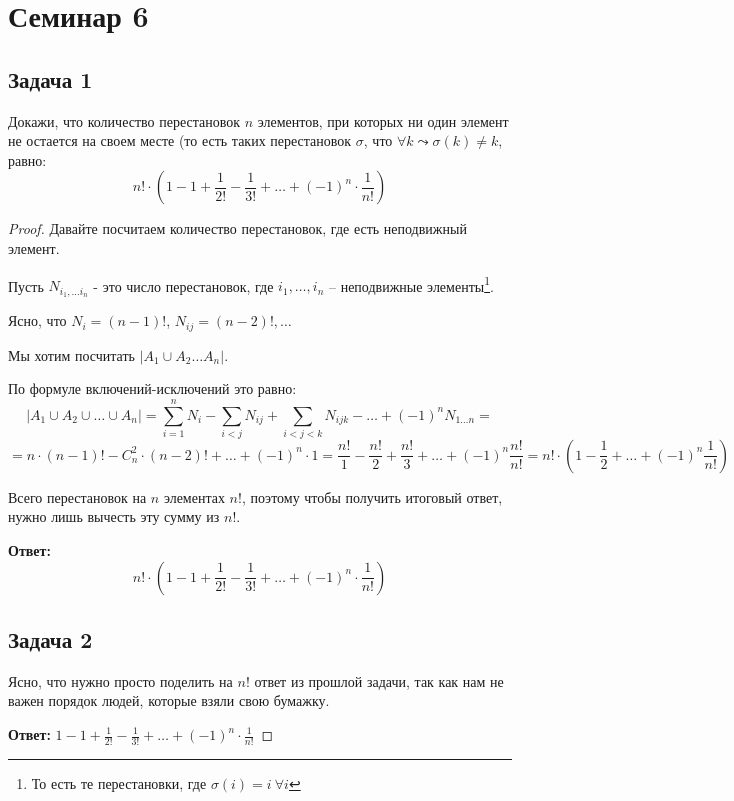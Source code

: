 
\section{Семинар 6}

\subsection{Задача 1}

Докажи, что количество перестановок $n$ элементов, при которых ни один элемент не
остается на своем месте (то есть таких перестановок $\sigma$, что $\forall k \leadsto \sigma(k) \neq  k$, равно:
\[
n! \cdot (1 - 1 + \frac{1}{2!} - \frac{1}{3!} + \ldots + (-1)^n \cdot \frac{1}{n!})
\]

\begin{proof}
Давайте посчитаем количество перестановок, где есть неподвижный элемент.

Пусть $N_{i_1, \ldots i_n}$ - это число перестановок, где $i_1, \ldots, i_n$ -- неподвижные элементы\footnote{То есть те перестановки, где $\sigma(i) = i \ \forall i $}.

Ясно, что $N_i = (n-1)!$, $N_{ij} = (n-2)!, \ldots$

Мы хотим посчитать $|A_1 \cup A_2 \ldots A_n|$.

По формуле включений-исключений это равно:
\[
|A_1 \cup A_2 \cup \ldots \cup A_n| = \sum_{i=1}^nN_i - \sum_{i<j}{N_{ij}} + \sum_{i<j<k}{N_{ijk}} - \ldots + (-1)^n N_{1\ldots n} =
\]
\[
= n \cdot (n-1)! - C^2_n \cdot (n-2)! + \ldots + (-1)^n \cdot 1 = \frac{n!}{1} - \frac{n!}{2} + \frac{n!}{3} + \ldots + (-1)^n \frac{n!}{n!} = n! \cdot (1 - \frac{1}{2}  + \ldots + (-1)^n \frac{1}{n!})
\]

Всего перестановок на $n$ элементах $n!$, поэтому чтобы получить итоговый ответ, нужно лишь вычесть эту сумму из $n!$.

\textbf{Ответ:}
\[
n! \cdot (1 - 1 + \frac{1}{2!} - \frac{1}{3!} + \ldots + (-1)^n \cdot \frac{1}{n!})
\]
\subsection{Задача 2}

Ясно, что нужно просто поделить на $n!$ ответ из прошлой задачи, так как нам не важен порядок людей, которые взяли свою бумажку.

\textbf{Ответ:} $1 - 1 + \frac{1}{2!} - \frac{1}{3!} + \ldots + (-1)^n \cdot \frac{1}{n!}$


\end{proof}
